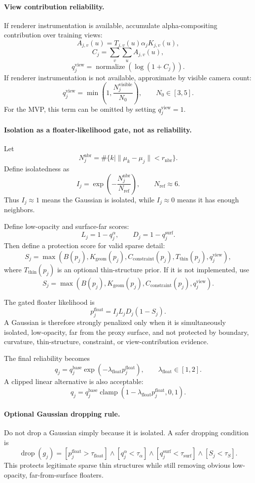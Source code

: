 \documentclass[11pt,a4paper]{article}
\newcommand{\clamp}{\operatorname{clamp}}
\newcommand{\normalize}{\operatorname{normalize}}
\begin{document}
\paragraph{View contribution reliability.}
If renderer instrumentation is available, accumulate alpha-compositing contribution over training views:
\[
A_{j,v}(u)=T_{j,v}(u)\alpha_jK_{j,v}(u),
\]
\[
C_j=\sum_v\sum_u A_{j,v}(u),
\]
\[
q_j^{\mathrm{view}}=\normalize\left(\log(1+C_j)\right).
\]
If renderer instrumentation is not available, approximate by visible camera count:
\[
q_j^{\mathrm{view}}=\min\left(1,\frac{N_j^{\mathrm{visible}}}{N_0}\right),
\qquad N_0\in[3,5].
\]
For the MVP, this term can be omitted by setting $q_j^{\mathrm{view}}=1$.

\paragraph{Isolation as a floater-likelihood gate, not as reliability.}
Let
\[
N_j^{\mathrm{nbr}}=\#\{k\mid \|\mu_k-\mu_j\|<r_{\mathrm{nbr}}\}.
\]
Define isolatedness as
\[
I_j=\exp\left(-\frac{N_j^{\mathrm{nbr}}}{N_{\mathrm{ref}}}\right),
\qquad N_{\mathrm{ref}}\approx 6.
\]
Thus $I_j\approx 1$ means the Gaussian is isolated, while $I_j\approx 0$ means it has enough neighbors.

Define low-opacity and surface-far scores:
\[
L_j=1-q_j^\alpha,
\qquad
D_j=1-q_j^{\mathrm{surf}}.
\]
Then define a protection score for valid sparse detail:
\[
S_j=\max\left(
B(p_j),
K_{\mathrm{geom}}(p_j),
C_{\mathrm{constraint}}(p_j),
T_{\mathrm{thin}}(p_j),
q_j^{\mathrm{view}}
\right),
\]
where $T_{\mathrm{thin}}(p_j)$ is an optional thin-structure prior. If it is not implemented, use
\[
S_j=\max\left(B(p_j),K_{\mathrm{geom}}(p_j),C_{\mathrm{constraint}}(p_j),q_j^{\mathrm{view}}\right).
\]

The gated floater likelihood is
\[
p_j^{\mathrm{float}}=I_j L_j D_j (1-S_j).
\]
A Gaussian is therefore strongly penalized only when it is simultaneously isolated, low-opacity, far from the proxy surface, and not protected by boundary, curvature, thin-structure, constraint, or view-contribution evidence.

The final reliability becomes
\[
q_j=q_j^{\mathrm{base}}\exp\left(-\lambda_{\mathrm{float}}p_j^{\mathrm{float}}\right),
\qquad \lambda_{\mathrm{float}}\in[1,2].
\]
A clipped linear alternative is also acceptable:
\[
q_j=q_j^{\mathrm{base}}\clamp(1-\lambda_{\mathrm{float}}p_j^{\mathrm{float}},0,1).
\]

\paragraph{Optional Gaussian dropping rule.}
Do not drop a Gaussian simply because it is isolated. A safer dropping condition is
\[
\operatorname{drop}(g_j)=
[p_j^{\mathrm{float}}>\tau_{\mathrm{float}}]
\land[q_j^\alpha<\tau_\alpha]
\land[q_j^{\mathrm{surf}}<\tau_{\mathrm{surf}}]
\land[S_j<\tau_S].
\]
This protects legitimate sparse thin structures while still removing obvious low-opacity, far-from-surface floaters.
\end{document}
